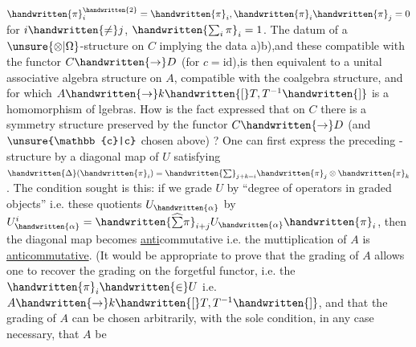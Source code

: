 
$\handwritten{\pi}_i^{\handwritten{2}}=\handwritten{\pi}_i,\handwritten{\pi}_i\handwritten{\pi}_j=0$ for $i\handwritten{\ne}j$, $\handwritten{\sum_i\pi}_i=1$. The datum of a $\unsure{\otimes|\Omega}$-structure on $C$ implying the data a)b),and these compatible with the functor $C\handwritten{\to}D$ (for $c=\mathrm{id}$),is then equivalent to a unital associative algebra structure on $A$, compatible with the coalgebra structure, and for which $A\handwritten{\to}k\handwritten{[}T,T^{-1}\handwritten{]}$ is a homomorphism of lgebras. How is the fact expressed that  on $C$ there is a symmetry structure  preserved by the functor $C\handwritten{\to}D$ (and $\unsure{\mathbb{c}|c}$ chosen above) ? One can first express the preceding -structure by a diagonal map of $U$ satisfying $\handwritten{\Delta}(\handwritten{\pi}_i)=\handwritten{\sum}_{j+k=i}\handwritten{\pi}_j\otimes\handwritten{\pi}_k$. The condition sought  is this: if we grade $U$ by ``degree of operators in graded objects'' i.e.  these quotients $U_{\handwritten{\alpha}}$ by $U_{\handwritten{\alpha}}^i=\handwritten{\widehat{\sum}\pi}_{i+j}U_{\handwritten{\alpha}}\handwritten{\pi}_i$, then the diagonal map becomes \uline{anti}commutative i.e. the muttiplication of $A$  is \uline{anticommutative}. (It would be appropriate to prove that the grading of $A$ allows one to recover the  grading on the forgetful functor, i.e. the $\handwritten{\pi}_i\handwritten{\in}U$ i.e. $A\handwritten{\to}k\handwritten{[}T,T^{-1}\handwritten{]}$, and that the grading of $A$  can be chosen arbitrarily, with the sole condition, in any case necessary, that $A$ be 